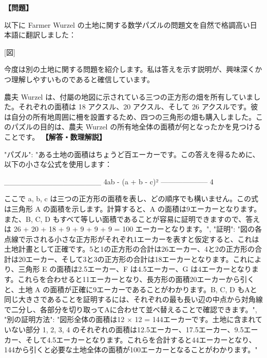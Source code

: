 \documentclass[10pt,a4paper,oneside,openany]{ltjsbook}
\begin{document}
\begin{tcolorbox}[colback=softblue,colframe=primaryblue,title=\textbf{第 190 問：FARMER WURZEL'S ESTATE.},arc=2mm,boxrule=1pt,breakable]
\textbf{【問題】}\par\vspace{0.3em}
以下に Farmer Wurzel の土地に関する数学パズルの問題文を自然で格調高い日本語に翻訳しました：

[図]

今度は別の土地に関する問題を紹介します。私は答えを示す説明が、興味深くかつ理解しやすいものであると確信しています。

農夫 Wurzel は、付屬の地図に示されている三つの正方形の畑を所有していました。それぞれの面積は 18 アクスル、20 アクスル、そして 26 アクスルです。彼は自分の所有地周囲に柵を設置するため、四つの三角形の畑も購入しました。このパズルの目的は、農夫 Wurzel の所有地全体の面積が何となったかを見つけることです。
\tcblower
\textbf{【解答・数理解説】}\par\vspace{0.3em}
{
    "パズル": "ある土地の面積はちょうど百エーカーです。この答えを得るために、以下の小さな公式を使用します：

      \_\_\_\_\_\_\_\_\_\_\_\_\_\_\_\_\_\_
    \/4ab - (a + b - c)²
    --------------------
              4

ここで a, b, c は三つの正方形の面積を表し、どの順序でも構いません。この式は三角形 A の面積を示します。計算すると、A の面積は9エーカーとなります。また、B, C, D もすべて等しい面積であることが容易に証明できますので、答えは 26 + 20 + 18 + 9 + 9 + 9 + 9 = 100 エーカーとなります。",
    "証明": "図の各点線で示される小さな正方形がそれぞれ1エーカーを表すと仮定すると、これは土地計畫として正確です。5と1の正方形の合計は26エーカー、4と2の正方形の合計は20エーカー、そして3と3の正方形の合計は18エーカーとなります。これにより、三角形 E の面積は2.5エーカー、F は4.5エーカー、G は4エーカーとなります。これらを合わせると11エーカーとなり、長方形の面積20エーカーから引くと、土地 A の面積が正確に9エーカーであることがわかります。B, C, D もAと同じ大きさであることを証明するには、それぞれの最も長い辺の中点から対角線で二分し、各部分を切り取ってAに合わせて並べ替えることで確認できます。",
    "別の証明方法": "図形全体の面積は12 × 12 = 144エーカーです。土地に含まれていない部分 1, 2, 3, 4 のそれぞれの面積は12.5エーカー、17.5エーカー、9.5エーカー、そして4.5エーカーとなります。これらを合計すると44エーカーとなり、144から引くと必要な土地全体の面積が100エーカーとなることがわかります。"
}
\end{tcolorbox}
\end{document}
